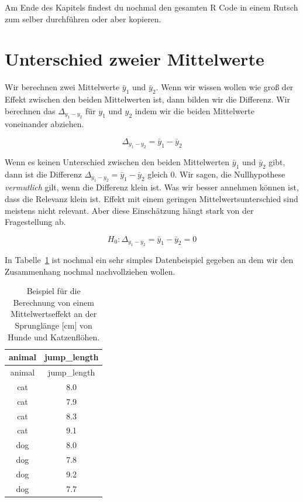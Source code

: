 \documentclass[
  letterpaper,
]{scrbook}
\begin{document}
Am Ende des Kapitels findest du nochmal den gesamten R Code in einem
Rutsch zum selber durchführen oder aber kopieren.

\hypertarget{unterschied-zweier-mittelwerte}{%
\section{Unterschied zweier
Mittelwerte}\label{unterschied-zweier-mittelwerte}}

Wir berechnen zwei Mittelwerte \(\bar{y}_1\) und \(\bar{y}_2\). Wenn wir
wissen wollen wie groß der Effekt zwischen den beiden Mittelwerten ist,
dann bilden wir die Differenz. Wir berechnen das \(\Delta_{y_1-y_2}\)
für \(y_1\) und \(y_2\) indem wir die beiden Mittelwerte voneinander
abziehen.

\[
\Delta_{y_1-y_2} = \bar{y}_1 - \bar{y}_2
\]

{}

Wenn es keinen Unterschied zwischen den beiden Mittelwerten
\(\bar{y}_1\) und \(\bar{y}_2\) gibt, dann ist die Differenz
\(\Delta_{y_1-y_2} = \bar{y}_1 - \bar{y}_2\) gleich 0. Wir sagen, die
Nullhypothese \emph{vermutlich} gilt, wenn die Differenz klein ist. Was
wir besser annehmen können ist, dass die Relevanz klein ist. Effekt mit
einem geringen Mittelwertsunterschied sind meistens nicht relevant. Aber
diese Einschätzung hängt stark von der Fragestellung ab.

\[
H_0: \Delta_{y_1-y_2} = \bar{y}_1 - \bar{y}_2 = 0
\]

In Tabelle~\ref{tbl-dog-cat-small-delta} ist nochmal ein sehr simples
Datenbeispiel gegeben an dem wir den Zusammenhang nochmal nachvollziehen
wollen.

\hypertarget{tbl-dog-cat-small-delta}{}
\begin{longtable}[]{@{}cc@{}}
\caption{\label{tbl-dog-cat-small-delta}Beispiel für die Berechnung von
einem Mittelwertseffekt an der Sprunglänge {[}cm{]} von Hunde und
Katzenflöhen.}\tabularnewline
\toprule()
animal & jump\_length \\
\midrule()
\endfirsthead
\toprule()
animal & jump\_length \\
\midrule()
\endhead
cat & 8.0 \\
cat & 7.9 \\
cat & 8.3 \\
cat & 9.1 \\
dog & 8.0 \\
dog & 7.8 \\
dog & 9.2 \\
dog & 7.7 \\
\bottomrule()
\end{longtable}
\end{document}
